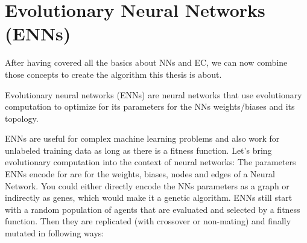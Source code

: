 \documentclass[11pt]{report}
\newcommand{\mydeflabel}{}
\newenvironment{mydef}[1]
 {\renewcommand\mydeflabel{#1}\begin{mydefinner}}
 {\end{mydefinner}}
\begin{document}
        \section{Evolutionary Neural Networks (ENNs)}\label{sec:evolutionary-neural-networks-(enns)}
    After having covered all the basics about NNs and EC, we can now combine those concepts to create the algorithm this thesis is about.
    \begin{mydef}{Evolutionary Neural Networks}
        Evolutionary neural networks (ENNs) are neural networks that use evolutionary computation to optimize for its parameters for the NNs weights/biases and its topology.
    \end{mydef}
    ENNs are useful for complex machine learning problems and also work for unlabeled training data as long as there is a fitness function.
    Let's bring evolutionary computation into the context of neural networks:
    The parameters ENNs encode for are for the weights, biases, nodes and edges of a Neural Network.
    You could either directly encode the NNs parameters as a graph or indirectly as genes, which would make it a genetic algorithm.
    ENNs still start with a random population of agents that are evaluated and selected by a fitness function.
    Then they are replicated (with crossover or non-mating) and finally mutated in following ways:
\end{document}

